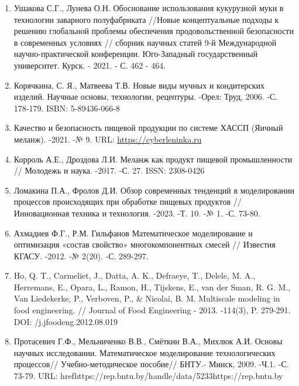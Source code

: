\begin{references}
\begin{enumerate}
\def\labelenumi{\arabic{enumi}.}
\setcounter{enumi}{2}
\item
  Ушакова С.Г., Лунева О.Н. Обоснование использования кукурузной муки в
  технологии заварного полуфабриката //Новые концептуальные подходы к
  решению глобальной проблемы обеспечения продовольственной безопасности
  в современных условиях // сборник научных статей 9-й Международной
  научно-практической конференции. Юго-Западный государственный
  университет. Курск. - 2021. - С. 462 - 464.
\item
  Корячкина, С. Я., Матвеева Т.В. Новые виды мучных и кондитерских
  изделий. Научные основы, технологии, рецептуры. -Орел: Труд, 2006. -С.
  178-179. ISBN: 5-89436-066-8
\item
  Качество и безопасность пищевой продукции по системе ХАССП (Яичный
  меланж). -2021. -№ 9. URL:
  \href{https://cyberleninka.ru/article/n/kachestvo-i-bezopasnost-pischevoy-produktsii-po-sisteme-hassp-yaichnyy-melanzh}{https://cyberleninka.ru}
\item
  Корроль А.Е., Дроздова Л.И. Меланж как продукт пищевой промышленности
  // Молодежь и наука. -2017. -С. 27. ISSN: 2308-0426
\item
  Ломакина П.А., Фролов Д.И. Обзор современных тенденций в моделировании
  процессов происходящих при обработке пищевых продуктов //
  Инновационная техника и технология. -2023. -Т. 10. -№ 1. -С. 73-80.
\item
  Ахмадиев Ф.Г., Р.М. Гильфанов Математическое моделирование и
  оптимизация «состав свойство» многокомпонентных смесей // Известия
  КГАСУ. -2012. -№ 2(20). -С. 289-297.
\item
  Ho, Q. T., Carmeliet, J., Datta, A. K., Defraeye, T., Delele, M. A.,
  Herremans, E., Opara, L., Ramon, H., Tijskens, E., van der Sman, R. G.
  M., Van Liedekerke, P., Verboven, P., \& Nicolai, B. M. Multiscale
  modeling in food engineering. // Journal of Food Engineering - 2013.
  -114(3), P. 279-291. DOI: /j.jfoodeng.2012.08.019
\item
  Протасевич Г.Ф., Мельниченко В.В., Смёткин В.А., Михлюк А.И. Основы
  научных исследовании. Математическое моделирование технологических
  процессов// Учебно-методическое пособие// БНТУ.- Минск, 2009. -Ч.1. -С.
  73-79. URL: href{https://rep.bntu.by/handle/data/5233}{https://rep.bntu.by}
\end{enumerate}
\end{references}

